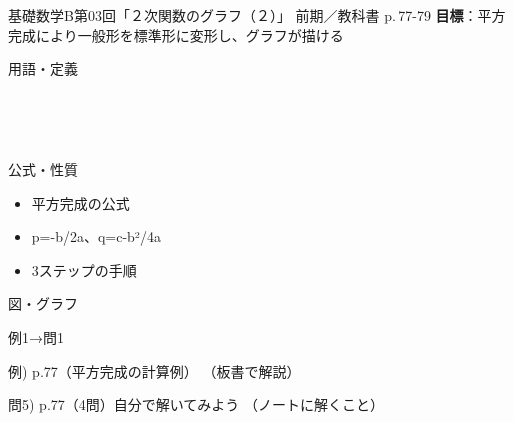 \documentclass[aspectratio=43,professionalfonts,handout]{beamer}
\newcommand{\LectureNum}{03}
\newcommand{\LectureTitle}{２次関数のグラフ（２）}
\newcommand{\TextPages}{p.\,77-79}
\newcommand{\CourseName}{基礎数学B}
\renewcommand{\TermName}{前期}
\begin{document}
\begin{frame}{\CourseName\quad 第\LectureNum 回「\LectureTitle 」}
  {\small \TermName\quad \TeacherName\quad ／\quad 教科書 \TextPages\quad
  \textbf{目標}：平方完成により一般形を標準形に変形し、グラフが描ける}

  \begin{block}{用語・定義}
  \begin{description}[labelwidth=5.5em]
    \item[\kw{平方完成}] ~
    \item[\kw{変形の手順}] ~
  \end{description}
  \end{block}
\end{frame}

\begin{frame}{公式・性質}
  \begin{block}{}
  \begin{itemize}
    \item 平方完成の公式
    \item p=-b/2a、q=c-b²/4a
    \item 3ステップの手順
  \end{itemize}
  \end{block}
\end{frame}

\begin{frame}{図・グラフ}
  \centering
\end{frame}

\begin{frame}{例1→問1}
  \begin{exampleblock}{例) p.77（平方完成の計算例）}
    （板書で解説）
  \end{exampleblock}

  \vfill

  \begin{block}{問5) p.77（4問）\quad 自分で解いてみよう}
    （ノートに解くこと）
  \end{block}
\end{frame}
\end{document}
